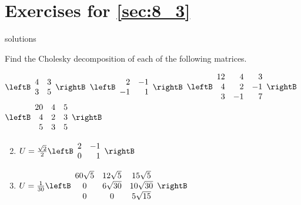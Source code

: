 
\section*{Exercises for \ref{sec:8_3}}

\begin{Filesave}{solutions}
\end{Filesave}

\begin{multicols}{2}
\begin{ex}
Find the Cholesky decomposition of each of the following matrices.


\begin{exenumerate}
\exitem $\leftB \begin{array}{rr}
4 & 3 \\
3 & 5
\end{array}\rightB$
\exitem $\leftB \begin{array}{rr}
2 & -1 \\
-1 & 1
\end{array}\rightB$
\exitem$\leftB \begin{array}{rrr}
12 & 4 & 3 \\
4 & 2 & -1 \\
3 & -1 & 7 
\end{array}\rightB$
\exitem $\leftB \begin{array}{rrr}
20 & 4 & 5 \\
4 & 2 & 3 \\
5 & 3 & 5 
\end{array}\rightB$
\end{exenumerate}
\begin{sol}
\begin{enumerate}[label={\alph*.}]
\setcounter{enumi}{1}
\item  $U = \frac{\sqrt{2}}{2} \leftB \begin{array}{rr}
2 & -1 \\
0 & 1 
\end{array}\rightB$

\setcounter{enumi}{3}
\item  
$U = \frac{1}{30} \leftB \begin{array}{ccc}
60\sqrt{5} & 12\sqrt{5} & 15\sqrt{5} \\
0 & 6\sqrt{30} & 10\sqrt{30} \\
0 & 0 & 5\sqrt{15}
\end{array}\rightB$


\end{enumerate}
\end{sol}
\end{ex}


\end{multicols}
